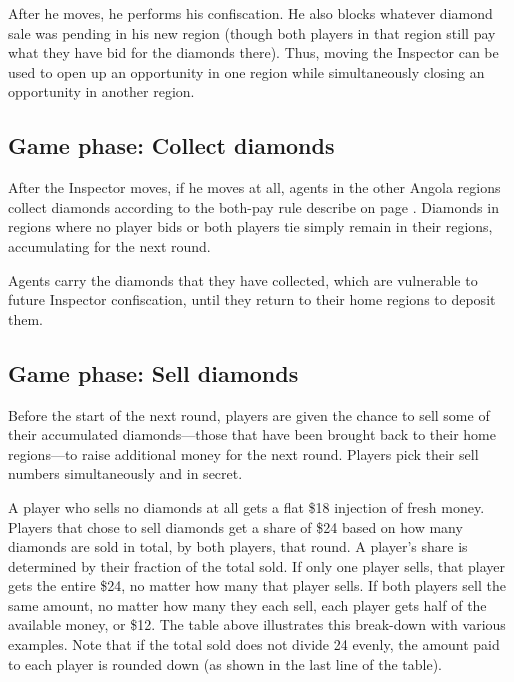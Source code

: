 \documentclass[8pt]{extbook}
\begin{document}
After he moves, he performs his confiscation.  He also blocks whatever diamond sale was pending in his new region (though both players in that region still pay what they have bid for the diamonds there).  Thus, moving the Inspector can be used to open up an opportunity in one region while simultaneously closing an opportunity in another region.

\subsection{Game phase:  Collect diamonds}
\label{sec:collectPhase}

After the Inspector moves, if he moves at all, agents in the other Angola regions collect diamonds according to the both-pay rule describe on page \pageref{sec:aboutBids}.  Diamonds in regions where no player bids or both players tie simply remain in their regions, accumulating for the next round.

Agents carry the diamonds that they have collected, which are vulnerable to future Inspector confiscation, until they return to their home regions to deposit them.


\subsection{Game phase:  Sell diamonds}
\label{sec:sellPhase}

Before the start of the next round, players are given the chance to sell some of their accumulated diamonds---those that have been brought back to their home regions---to raise additional money for the next round.  Players pick their sell numbers simultaneously and in secret.

A player who sells no diamonds at all gets a flat \$18 injection of fresh money.  Players that chose to sell diamonds get a share of \$24 based on how many diamonds are sold in total, by both players, that round.  A player's share is determined by their fraction of the total sold.  If only one player sells, that player gets the entire \$24, no matter how many that player sells.  If both players sell the same amount, no matter how many they each sell, each player gets half of the available money, or \$12.  The table above illustrates this break-down with various examples.  Note that if the total sold does not divide 24 evenly, the amount paid to each player is rounded down (as shown in the last line of the table).
\end{document}
